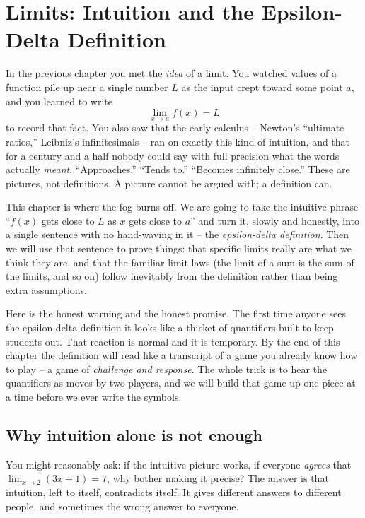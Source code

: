 \chapter{Limits: Intuition and the Epsilon-Delta Definition}

In the previous chapter you met the \emph{idea} of a limit. You watched values
of a function pile up near a single number $L$ as the input crept toward some
point $a$, and you learned to write
\[
  \lim_{x \to a} f(x) = L
\]
to record that fact. You also saw that the early calculus -- Newton's
``ultimate ratios,'' Leibniz's infinitesimals -- ran on exactly this kind of
intuition, and that for a century and a half nobody could say with full
precision what the words actually \emph{meant}. ``Approaches.'' ``Tends to.''
``Becomes infinitely close.'' These are pictures, not definitions. A picture
cannot be argued with; a definition can.

This chapter is where the fog burns off. We are going to take the intuitive
phrase ``$f(x)$ gets close to $L$ as $x$ gets close to $a$'' and turn it,
slowly and honestly, into a single sentence with no hand-waving in it -- the
\emph{epsilon-delta definition}. Then we will use that sentence to prove things:
that specific limits really are what we think they are, and that the
familiar limit laws (the limit of a sum is the sum of the limits, and so on)
follow inevitably from the definition rather than being extra assumptions.

Here is the honest warning and the honest promise. The first time anyone sees
the epsilon-delta definition it looks like a thicket of quantifiers built to
keep students out. That reaction is normal and it is temporary. By the end of
this chapter the definition will read like a transcript of a game you already
know how to play -- a game of \emph{challenge and response}. The whole trick is
to hear the quantifiers as moves by two players, and we will build that game up
one piece at a time before we ever write the symbols.

\chapterline

\section{Why intuition alone is not enough}
\label{ch06:why-not-enough}

You might reasonably ask: if the intuitive picture works, if everyone
\emph{agrees} that $\lim_{x\to 2}(3x+1) = 7$, why bother making it precise? The
answer is that intuition, left to itself, contradicts itself. It gives
different answers to different people, and sometimes the wrong answer to
everyone.

